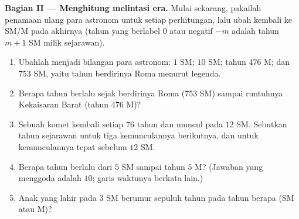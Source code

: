 \begin{problem}
\medskip
\noindent\textbf{Bagian II --- Menghitung melintasi era.}
Mulai sekarang, pakailah penamaan ulang para astronom untuk setiap
perhitungan, lalu ubah kembali ke SM/M pada akhirnya (tahun yang
berlabel $0$ atau negatif $-m$ adalah tahun $m + 1$ SM milik sejarawan).
\begin{enumerate}[resume]
  \item Ubahlah menjadi bilangan para astronom: $1$ SM; $10$ SM;
        tahun $476$ M; dan $753$ SM, yaitu tahun berdirinya Roma
        menurut legenda.
  \item Berapa tahun berlalu sejak berdirinya Roma ($753$ SM) sampai
        runtuhnya Kekaisaran Barat (tahun $476$ M)?
  \item Sebuah komet kembali setiap $76$ tahun dan muncul pada $12$
        SM. Sebutkan tahun sejarawan untuk tiga kemunculannya
        berikutnya, dan untuk kemunculannya tepat sebelum $12$ SM.
  \item Berapa tahun berlalu dari $5$ SM sampai tahun $5$ M? (Jawaban
        yang menggoda adalah $10$; garis waktunya berkata lain.)
  \item Anak yang lahir pada $3$ SM berumur sepuluh tahun pada tahun
        berapa (SM atau M)?
\end{enumerate}


\end{problem}
